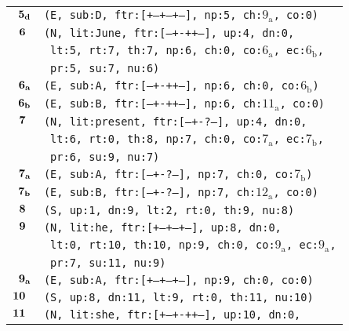 \documentclass{article}
\begin{document}
\begin{minipage}{\textwidth}
{\begin{tabular}{|r|l|}
    ${\textbf{\textrm{5}}_{\textbf{\textrm{d}}}}$ & \texttt{\texttt{(E,~sub:D,~ftr:[+--+--+--],~np:5,~ch:${\textrm{9}_{\textrm{a}}}$,~co:0)}} \\
    ${\textbf{\textrm{6}}_{\phantom{z}}}$ & \texttt{\texttt{(N,~lit:June,~ftr:[---+-++--],~up:4,~dn:0,}} \\
    & \texttt{\texttt{~lt:5,~rt:7,~th:7,~np:6,~ch:0,~co:${\textrm{6}_{\textrm{a}}}$,~ec:${\textrm{6}_{\textrm{b}}}$,}} \\
    & \texttt{\texttt{~pr:5,~su:7,~nu:6)}} \\
    ${\textbf{\textrm{6}}_{\textbf{\textrm{a}}}}$ & \texttt{\texttt{(E,~sub:A,~ftr:[---+-++--],~np:6,~ch:0,~co:${\textrm{6}_{\textrm{b}}}$)}} \\
    ${\textbf{\textrm{6}}_{\textbf{\textrm{b}}}}$ & \texttt{\texttt{(E,~sub:B,~ftr:[---+-++--],~np:6,~ch:${\textrm{11}_{\textrm{a}}}$,~co:0)}} \\
    ${\textbf{\textrm{7}}_{\phantom{z}}}$ & \texttt{\texttt{(N,~lit:present,~ftr:[---+-?---],~up:4,~dn:0,}} \\
    & \texttt{\texttt{~lt:6,~rt:0,~th:8,~np:7,~ch:0,~co:${\textrm{7}_{\textrm{a}}}$,~ec:${\textrm{7}_{\textrm{b}}}$,}} \\
    & \texttt{\texttt{~pr:6,~su:9,~nu:7)}} \\
    ${\textbf{\textrm{7}}_{\textbf{\textrm{a}}}}$ & \texttt{\texttt{(E,~sub:A,~ftr:[---+-?---],~np:7,~ch:0,~co:${\textrm{7}_{\textrm{b}}}$)}} \\
    ${\textbf{\textrm{7}}_{\textbf{\textrm{b}}}}$ & \texttt{\texttt{(E,~sub:B,~ftr:[---+-?---],~np:7,~ch:${\textrm{12}_{\textrm{a}}}$,~co:0)}} \\
    ${\textbf{\textrm{8}}_{\phantom{z}}}$ & \texttt{\texttt{(S,~up:1,~dn:9,~lt:2,~rt:0,~th:9,~nu:8)}} \\
    ${\textbf{\textrm{9}}_{\phantom{z}}}$ & \texttt{\texttt{(N,~lit:he,~ftr:[+--+--+--],~up:8,~dn:0,}} \\
    & \texttt{\texttt{~lt:0,~rt:10,~th:10,~np:9,~ch:0,~co:${\textrm{9}_{\textrm{a}}}$,~ec:${\textrm{9}_{\textrm{a}}}$,}} \\
    & \texttt{\texttt{~pr:7,~su:11,~nu:9)}} \\
    ${\textbf{\textrm{9}}_{\textbf{\textrm{a}}}}$ & \texttt{\texttt{(E,~sub:A,~ftr:[+--+--+--],~np:9,~ch:0,~co:0)}} \\
    ${\textbf{\textrm{10}}_{\phantom{z}}}$ & \texttt{\texttt{(S,~up:8,~dn:11,~lt:9,~rt:0,~th:11,~nu:10)}} \\
    ${\textbf{\textrm{11}}_{\phantom{z}}}$ & \texttt{\texttt{(N,~lit:she,~ftr:[+--+-++--],~up:10,~dn:0,}} \\

\end{tabular}}
\end{minipage}
\end{document}
